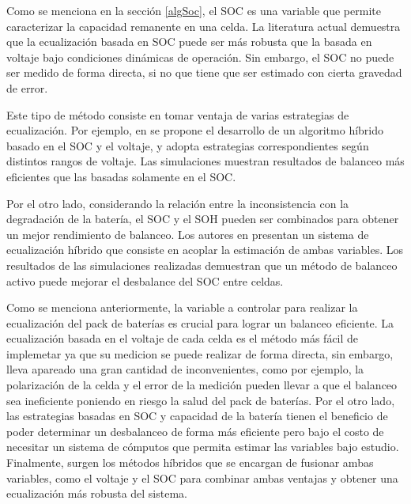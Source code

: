 \documentclass[10pt,a4paper]{article}
\newcounter{subsubsubsection}[subsubsection]
\begin{document}

Como se menciona en la secci\'on \ref{algSoc}, el \acrshort{SOC} es una variable
que permite caracterizar la capacidad remanente en una celda. La literatura
actual demuestra que la ecualizaci\'on basada en \acrshort{SOC} puede ser m\'as 
robusta que la basada en voltaje bajo condiciones din\'amicas de operaci\'on.
Sin embargo, el \acrshort{SOC} no puede ser medido de forma directa, si no que
tiene que ser estimado con cierta gravedad de error.


Este tipo de m\'etodo consiste en tomar ventaja de varias estrategias de
ecualizaci\'on. Por ejemplo, en \cite{ZHANG20194702} se propone el desarrollo de 
un algoritmo h\'ibrido basado en el \acrshort{SOC} y el voltaje, y adopta 
estrategias correspondientes seg\'un distintos rangos de voltaje. Las 
simulaciones muestran resultados de balanceo m\'as eficientes que las basadas 
solamente en el \acrshort{SOC}. 

Por el otro lado, considerando la relaci\'on entre la inconsistencia con la
degradaci\'on de la bater\'ia, el \acrshort{SOC} y el \acrshort{SOH} pueden ser
combinados para obtener un mejor rendimiento de balanceo. Los autores en
\cite{REN2019908} presentan un sistema de ecualizaci\'on h\'ibrido que consiste 
en acoplar la estimaci\'on de ambas variables. Los resultados de las 
simulaciones realizadas demuestran que un m\'etodo de balanceo activo puede 
mejorar el desbalance del \acrshort{SOC} entre celdas.


Como se menciona anteriormente, la variable a controlar para realizar la
ecualizaci\'on del pack de bater\'ias es crucial para lograr un balanceo
eficiente. La ecualizaci\'on basada en el voltaje de cada celda es el m\'etodo
m\'as f\'acil de implemetar ya que su medicion se puede realizar de forma
directa, sin embargo, lleva apareado una gran cantidad de inconvenientes, como
por ejemplo, la polarizaci\'on de la celda y el error de la medici\'on pueden
llevar a que el balanceo sea ineficiente poniendo en riesgo la salud del pack
de bater\'ias. Por el otro lado, las estrategias basadas en \acrshort{SOC} y
capacidad de la bater\'ia tienen el beneficio de poder determinar un desbalanceo
de forma m\'as eficiente pero bajo el costo de necesitar un sistema de
c\'omputos que permita estimar las variables bajo estudio. Finalmente, surgen
los m\'etodos h\'ibridos que se encargan de fusionar ambas variables, como el
voltaje y el \acrshort{SOC} para combinar ambas ventajas y obtener una
ecualizaci\'on m\'as robusta del sistema.
\end{document}
